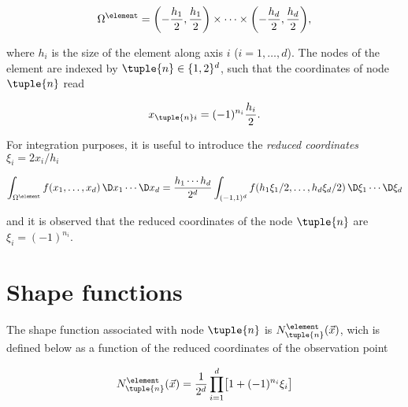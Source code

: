 \documentclass[oneside]{memoir}
\begin{document}
\begin{equation*}
\begin{split}\Omega^\element=\biggl(-\frac{h_1}2, \frac{h_1}2\biggr)\times\cdots
\times\biggl(-\frac{h_d}2, \frac{h_d}2\biggr),\end{split}\end{equation*}


where \(h_i\) is the size of the element along axis \(i\) (\(i=1, \dots, d\)). The nodes of the element are indexed by \(\tuple{n}\in\{1, 2\}^d\), such that the coordinates of node \(\tuple{n}\) read



\begin{equation*}
\begin{split}x_{\tuple{n}i}=(-1)^{n_i}\frac{h_i}2.\end{split}\end{equation*}


For integration purposes, it is useful to introduce the \emph{reduced coordinates} \(\xi_i=2x_i/h_i\)



\begin{equation*}
\begin{split}\int_{\Omega^\element}f(x_1, \ldots, x_d)\,\D x_1\cdots\D x_d
=\frac{h_1\cdots h_d}{2^d}\int_{(-1, 1)^d}f(h_1\xi_1/2, \ldots, h_d\xi_d/2)
\,\D\xi_1\cdots\D\xi_d\end{split}\end{equation*}


and it is observed that the reduced coordinates of the node \(\tuple{n}\) are \(\xi_i=(-1)^{n_i}\).



\hypertarget{17125853350239781481}{}


\section{Shape functions}



The shape function associated with node \(\tuple{n}\) is \(N^\element_{\tuple{n}}(\vec x)\), wich is defined below as a function of the reduced coordinates of the observation point



\begin{equation*}
\begin{split}N^\element_{\tuple{n}}(\vec x)=\frac1{2^d}\prod_{i=1}^d\bigl[1+(-1)^{n_i}\xi_i\bigr]\end{split}\end{equation*}
\end{document}
